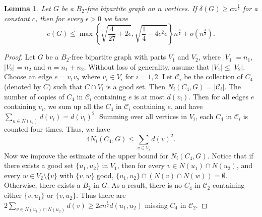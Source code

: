 \documentclass[11pt,a4paper]{article}
\newtheorem{lemma}{Lemma}[section]
\theoremstyle{definition}
\begin{document}
        \begin{lemma}\label{lem: B2 free bipartite}
            Let $G$ be a $B_2$-free bipartite graph on $n$ vertices.
            If $\delta(G)\geq cn^{\frac{1}{2}}$ for a constant $c$, then for every $\epsilon>0$ we have
            $$e(G)\leq \max\left\{\sqrt{\frac{4}{27}+2\epsilon},\sqrt{\frac{1}{4}-4c^2\epsilon}\right\}n^{\frac{3}{2}}+o(n^{\frac{3}{2}}).$$
        \end{lemma}
        \begin{proof}
            Let $G$ be a $B_2$-free bipartite graph with parts $V_1$ and $V_2$, where $|V_1|=n_1$, $|V_2|=n_2$ and $n=n_1+n_2$.
            Without loss of generality, assume that $|V_1| \leq |V_2|$.
            Choose an edge $e=v_1v_2$ where $v_i\in V_i$ for $i=1,2$. 
            Let $\mathcal{C}_i$ be the collection of $C_4$ (denoted by $C$) such that $C \cap V_i$ is a good set.
            Then $N_i(C_4, G) = |\mathcal{C}_i|$.
            The number of copies of $C_4$ in $\mathcal{C}_i$ containing $e$ is at most $d(v_i)$.
            Then for all edges $e$ containing $v_i$, we sum up all the $C_4$ in $\mathcal{C}_i$ containing $e$, and have $\sum_{u\in N(v_i)}d(v_i)=d(v_i)^2$.
            Summing over all vertices in $V_i$, each $C_4$ in $\mathcal{C}_i$ is counted four times. Thus, we have
            $$4N_i(C_4, G)\leq \sum_{v\in V_i}d(v)^2.$$
            Now we improve the estimate of the upper bound for $N_i(C_4, G)$.
            Notice that if there exists a good set $\{u_1,u_2\}$ in $V_1$, then for every $v\in N(u_1)\cap N(u_2)$, and every $w\in V_2\setminus \{v\}$ with $\{v,w\}$ good, $\{u_1,u_2\}\cap (N(v)\cap N(w))=\emptyset$.
            Otherwise, there exists a $B_2$ in $G$.
            As a result, there is no $C_4$ in $\mathcal{C}_2$ containing either $\{v, u_1\}$ or $\{v, u_2\}$.
            Thus there are $2\sum_{v\in N(u_1)\cap N(u_2)}d(v)\geq 2cn^{\frac{1}{2}}d(u_1,u_2)$ missing $C_4$ in $\mathcal{C}_2$.

\end{proof}
\end{document}
